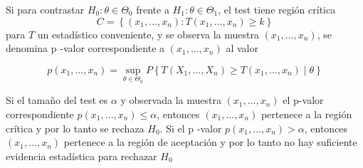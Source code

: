 
\begin{definición} [p-valor]
 Si para contrastar $H_{0}: \theta \in \Theta_{0}$ frente a $H_{1}: \theta \in \Theta_{1}$, el test tiene región crítica 
 $$C=\left\{\left(x_{1}, \ldots, x_{n}\right): T\left(x_{1}, \ldots, x_{n}\right) \geq k\right\}$$
 para $T$ un estadístico conveniente, y se observa la muestra $\left(x_{1}, \ldots, x_{n}\right)$, se denomina p -valor correspondiente a $\left(x_{1}, \ldots, x_{n}\right)$ al valor

$$
p\left(x_{1}, \ldots, x_{n}\right)=\sup _{\theta \in \Theta_{0}} P\left\{T\left(X_{1}, \ldots, X_{n}\right) \geq T\left(x_{1}, \ldots, x_{n}\right) \mid \theta\right\}
$$

Si el tamaño del test es $\alpha$ y observada la muestra $\left(x_{1}, \ldots, x_{n}\right)$ el p-valor correspondiente $p\left(x_{1}, \ldots, x_{n}\right) \leq \alpha$, entonces $\left(x_{1}, \ldots, x_{n}\right)$ pertenece a la región crítica y por lo tanto se rechaza $H_{0}$. Si el p -valor $p\left(x_{1}, \ldots, x_{n}\right)>\alpha$, entonces $\left(x_{1}, \ldots, x_{n}\right)$ pertenece a la región de aceptación y por lo tanto no hay suficiente evidencia estadística para rechazar $H_{0}$
\end{definición}

